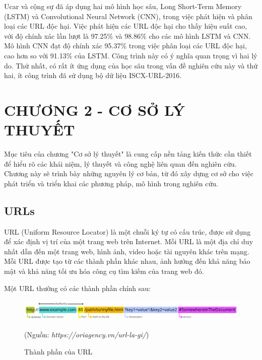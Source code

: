 \documentclass[13pt]{article}
\renewcommand{\thesubsection}{\thesection.\arabic{subsection}} %
\begin{document}
    Ucar và cộng sự đã áp dụng hai mô hình học sâu, Long Short-Term Memory (LSTM) và Convolutional Neural Network (CNN), trong việc phát hiện và phân loại các URL độc hại. Việc phát hiện các URL độc hại cho thấy hiệu suất cao, với độ chính xác lần lượt là 97.25\% và 98.86\% cho các mô hình LSTM và CNN. Mô hình CNN đạt độ chính xác 95.37\% trong việc phân loại các URL độc hại, cao hơn so với 91.13\% của LSTM. Công trình này có ý nghĩa quan trọng vì hai lý do. Thứ nhất, có rất ít ứng dụng của học sâu trong vấn đề nghiên cứu này và thứ hai, ít công trình đã sử dụng bộ dữ liệu ISCX-URL-2016.

\newpage
\renewcommand{\thesubsection}{\thesection.\arabic{subsection}} %
\setcounter{section}{2} %
\setcounter{subsection}{0}
\section*{CHƯƠNG 2 - CƠ SỞ LÝ THUYẾT}
Mục tiêu của chương "Cơ sở lý thuyết" là cung cấp nền tảng kiến thức cần thiết để hiểu rõ các khái niệm, lý thuyết và công nghệ liên quan đến nghiên cứu. Chương này sẽ trình bày những nguyên lý cơ bản, từ đó xây dựng cơ sở cho việc phát triển và triển khai các phương pháp, mô hình trong nghiên cứu.
\subsection{URLs}
URL (Uniform Resource Locator) là một chuỗi ký tự có cấu trúc, được sử dụng để xác định vị trí của một trang web trên Internet. Mỗi URL là một địa chỉ duy nhất dẫn đến một trang web, hình ảnh, video hoặc tài nguyên khác trên mạng. Mỗi URL được tạo từ các thành phần khác nhau, ảnh hưởng đến khả năng bảo mật và khả năng tối ưu hóa công cụ tìm kiếm của trang web đó.

Một URL thường có các thành phần chính sau:

    \begin{figure}[h!]
        \centering        \includegraphics[width=0.7\linewidth]{image/h2.png}
            \caption{ Thành phần của URL}
            \label{fig:label1}
             (Nguồn: \textit{https://oriagency.vn/url-la-gi/})
    \end{figure}
\end{document}
